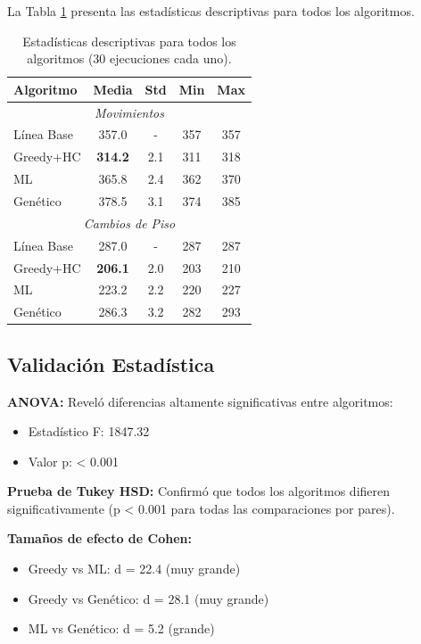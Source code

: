 \documentclass[12pt,a4paper]{article}
\begin{document}
La Tabla \ref{tab:results} presenta las estadísticas descriptivas para todos los algoritmos.

\begin{table}[h]
\centering
\caption{Estadísticas descriptivas para todos los algoritmos (30 ejecuciones cada uno).}
\label{tab:results}
\begin{tabular}{lcccc}
\toprule
\textbf{Algoritmo} & \textbf{Media} & \textbf{Std} & \textbf{Min} & \textbf{Max} \\
\midrule
\multicolumn{5}{c}{\textit{Movimientos}} \\
\midrule
Línea Base & 357.0 & - & 357 & 357 \\
Greedy+HC & \textbf{314.2} & 2.1 & 311 & 318 \\
ML & 365.8 & 2.4 & 362 & 370 \\
Genético & 378.5 & 3.1 & 374 & 385 \\
\midrule
\multicolumn{5}{c}{\textit{Cambios de Piso}} \\
\midrule
Línea Base & 287.0 & - & 287 & 287 \\
Greedy+HC & \textbf{206.1} & 2.0 & 203 & 210 \\
ML & 223.2 & 2.2 & 220 & 227 \\
Genético & 286.3 & 3.2 & 282 & 293 \\
\bottomrule
\end{tabular}
\end{table}

\subsection{Validación Estadística}

\textbf{ANOVA:} Reveló diferencias altamente significativas entre algoritmos:
\begin{itemize}
\item Estadístico F: 1847.32
\item Valor p: < 0.001
\end{itemize}

\textbf{Prueba de Tukey HSD:} Confirmó que todos los algoritmos difieren significativamente (p < 0.001 para todas las comparaciones por pares).

\textbf{Tamaños de efecto de Cohen:}
\begin{itemize}
\item Greedy vs ML: d = 22.4 (muy grande)
\item Greedy vs Genético: d = 28.1 (muy grande)
\item ML vs Genético: d = 5.2 (grande)
\end{itemize}
\end{document}
